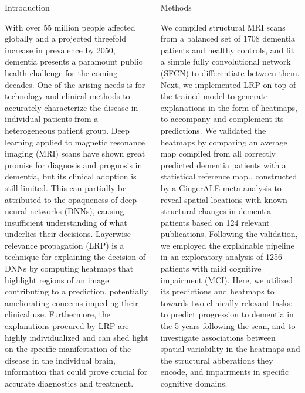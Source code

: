 \documentclass[final,11pt]{beamer}
\begin{document}
\begin{frame}[t]
        \vspace{1cm}
        

        \begin{columns}[t]
            \begin{column}{.3\textwidth}
                \begin{block}{Introduction}
                    \parbox{\linewidth}{\justify
With over 55 million people affected globally and a projected threefold increase in prevalence by 2050, dementia presents a paramount public health challenge for the coming decades. One of the arising needs is for technology and clinical methods to accurately characterize the disease in individual patients from a heterogeneous patient group. Deep learning applied to magnetic resonance imaging (MRI) scans have shown great promise for diagnosis and prognosis in dementia, but its clinical adoption is still limited. This can partially be attributed to the opaqueness of deep neural networks (DNNs), causing insufficient understanding of what underlies their decisions. Layerwise relevance propagation (LRP) is a technique for explaining the decision of DNNs by computing heatmaps that highlight regions of an image contributing to a prediction, potentially ameliorating concerns impeding their clinical use. Furthermore, the explanations procured by LRP are highly individualized and can shed light on the specific manifestation of the disease in the individual brain, information that could prove crucial for accurate diagnostics and treatment.
                    }
                \end{block}
            \end{column}
            \begin{column}{.3\textwidth}
                \begin{block}{Methods}
                    \parbox{\linewidth}{\justify
We compiled structural MRI scans from a balanced set of 1708 dementia patients and healthy controls, and fit a simple fully convolutional network (SFCN) to differentiate between them. Next, we implemented LRP on top of the trained model to generate explanations in the form of heatmaps, to accompany and complement its predictions. We validated the heatmaps by comparing an average map compiled from all correctly predicted dementia patients with a statistical reference map., constructed by a GingerALE meta-analysis to reveal spatial locations with known structural changes in dementia patients based on 124 relevant publications. Following the validation, we employed the explainable pipeline in an exploratory analysis of 1256 patients with mild cognitive impairment (MCI). Here, we utilized its predictions and heatmaps to towards two clinically relevant tasks: to predict progression to dementia in the 5 years following the scan, and to investigate associations between spatial variability in the heatmaps and the structural abberations they encode, and impairments in specific cognitive domains.
                    }
                \end{block}


\end{column}
\end{columns}
\end{frame}
\end{document}
